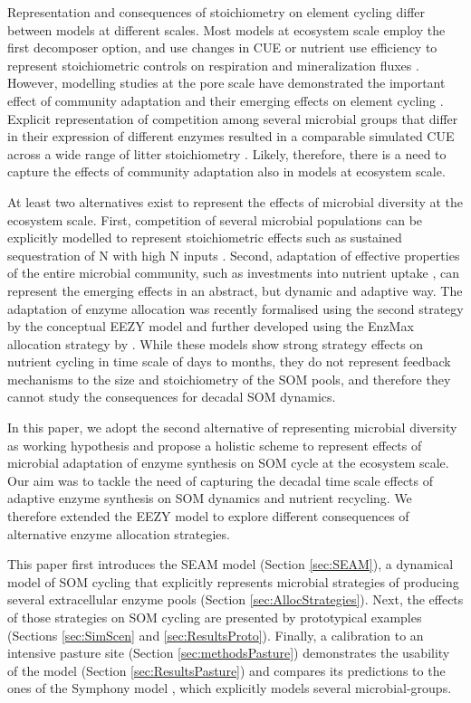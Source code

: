Representation and consequences of stoichiometry on element cycling differ
between models at different scales. Most models at ecosystem scale employ the
first decomposer option, and use changes in CUE or nutrient use efficiency to
represent stoichiometric controls on respiration and mineralization fluxes
\citep{Manzoni08}. However, modelling studies at the pore scale have
demonstrated the important effect of community adaptation and their emerging
effects on element cycling \citep{Allison05, Resat11, Wang13}. Explicit
representation of competition among several microbial groups that differ in
their expression of different enzymes resulted in a comparable simulated CUE
across a wide range of litter stoichiometry \citep{Kaiser14}. Likely, therefore,
there is a need to capture the effects of community adaptation also in models at
ecosystem scale.

At least two alternatives exist to represent the effects of microbial diversity
at the ecosystem scale. First, competition of several microbial populations can
be explicitly modelled to represent stoichiometric effects such as sustained
sequestration of N with high N inputs \citep{Perveen14}. Second, adaptation of
effective properties of the entire microbial community, such as investments into
nutrient uptake \citep{Rastetter97, Rastetter11}, can represent the emerging
effects in an abstract, but dynamic and adaptive way. The adaptation of enzyme
allocation was recently formalised using the second strategy by the conceptual
EEZY model \citep{Moorhead12} and further developed using the EnzMax allocation
strategy by \citep{Averill14}.
While these models show strong strategy effects on nutrient cycling in time
scale of days to months, they do not represent feedback mechanisms to the
size and stoichiometry of the SOM pools, and therefore they cannot study the
consequences for decadal SOM dynamics.

In this paper, we adopt the second alternative of representing microbial
diversity as working hypothesis and propose a holistic scheme to represent
effects of microbial adaptation of enzyme synthesis on SOM cycle at the
ecosystem scale. Our aim was to tackle the need of capturing the decadal time
scale effects of adaptive enzyme synthesis on SOM dynamics and nutrient
recycling. We therefore extended the EEZY model to explore different
consequences of alternative enzyme allocation strategies.

This paper first introduces the SEAM model (Section \ref{sec:SEAM}), a dynamical
model of SOM cycling that explicitly represents microbial strategies of
producing several extracellular enzyme pools (Section
\ref{sec:AllocStrategies}). Next, the effects of those strategies on SOM cycling
are presented by prototypical examples (Sections \ref{sec:SimScen} and
\ref{sec:ResultsProto}).
Finally, a calibration to an intensive pasture site (Section
\ref{sec:methodsPasture}) demonstrates the usability of the model (Section
\ref{sec:ResultsPasture}) and compares its predictions to the ones of the
Symphony model \citep{Perveen14}, which explicitly models several
microbial-groups. 

